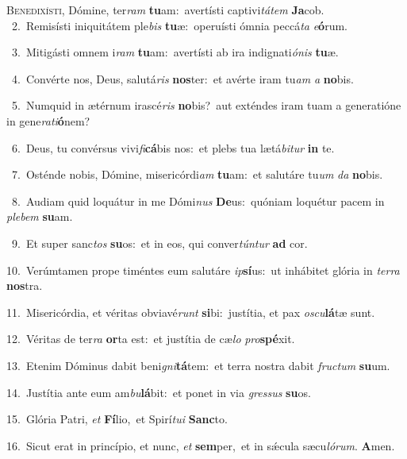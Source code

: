 \lettrine{\initial\textcolor{\initialcolor}{B}}{enedixísti,} Dómine, ter\textit{ram} \textbf{tu}\-am:~\star avertísti captivi\-\textit{tá}\-\textit{tem} \textbf{Ja}\-cob.\\
{\numbfont\textcolor{\numbcolor}{~2.}}~Remisísti iniquitátem ple\textit{bis} \textbf{tu}\-æ:~\star operuísti ómnia peccá\textit{ta} \textit{e}\-\textbf{ó}rum.\par
{\numbfont\textcolor{\numbcolor}{~3.}}~Mitigásti omnem i\textit{ram} \textbf{tu}\-am:~\star avertísti ab ira indignati\-\textit{ó}\-\textit{nis} \textbf{tu}\-æ.\par
{\numbfont\textcolor{\numbcolor}{~4.}}~Convérte nos, Deus, salutá\textit{ris} \textbf{nos}\-ter:~\star et avérte iram tu\textit{am} \textit{a} \textbf{no}\-bis.\par
{\numbfont\textcolor{\numbcolor}{~5.}}~Numquid in ætérnum irascé\textit{ris} \textbf{no}\-bis?~\star aut exténdes iram tuam a generatióne in gene\-\textit{ra}\-\textit{ti}\textbf{ó}nem?\par
{\numbfont\textcolor{\numbcolor}{~6.}}~Deus, tu convérsus vivi\-\textit{fi}\-\textbf{cá}bis nos:~\star et plebs tua lætá\-\textit{bi}\-\textit{tur} \textbf{in} te.\par
{\numbfont\textcolor{\numbcolor}{~7.}}~Osténde nobis, Dómine, misericórdi\textit{am} \textbf{tu}\-am:~\star et salutáre tu\textit{um} \textit{da} \textbf{no}\-bis.\par
{\numbfont\textcolor{\numbcolor}{~8.}}~Audiam quid loquátur in me Dómi\textit{nus} \textbf{De}\-us:~\star quóniam loquétur pacem in \textit{ple}\-\textit{bem} \textbf{su}\-am.\par
{\numbfont\textcolor{\numbcolor}{~9.}}~Et super sanc\textit{tos} \textbf{su}\-os:~\star et in eos, qui conver\-\textit{tún}\-\textit{tur} \textbf{ad} cor.\par
{\numbfont\textcolor{\numbcolor}{10.}}~Verúmtamen prope timéntes eum salutáre \textit{ip}\-\textbf{sí}us:~\star ut inhábitet glória in \textit{ter}\-\textit{ra} \textbf{nos}\-tra.\par
{\numbfont\textcolor{\numbcolor}{11.}}~Misericórdia, et véritas obviavé\textit{runt} \textbf{si}\-bi:~\star justítia, et pax \textit{os}\-\textit{cu}\textbf{lá}tæ sunt.\par
{\numbfont\textcolor{\numbcolor}{12.}}~Véritas de ter\textit{ra} \textbf{or}\-ta est:~\star et justítia de cæ\textit{lo} \textit{pro}\-\textbf{spé}xit.\par
{\numbfont\textcolor{\numbcolor}{13.}}~Etenim Dóminus dabit beni\-\textit{gni}\-\textbf{tá}tem:~\star et terra nostra dabit \textit{fruc}\-\textit{tum} \textbf{su}\-um.\par
{\numbfont\textcolor{\numbcolor}{14.}}~Justítia ante eum am\-\textit{bu}\-\textbf{lá}bit:~\star et ponet in via \textit{gres}\-\textit{sus} \textbf{su}\-os.\par
{\numbfont\textcolor{\numbcolor}{15.}}~Glória Patri, \textit{et} \textbf{Fí}\-lio,~\star et Spirí\-\textit{tu}\-\textit{i} \textbf{Sanc}\-to.\par
{\numbfont\textcolor{\numbcolor}{16.}}~Sicut erat in princípio, et nunc, \textit{et} \textbf{sem}\-per,~\star et in sǽcula sæcu\-\textit{ló}\-\textit{rum}. \textbf{A}\-men.\par
